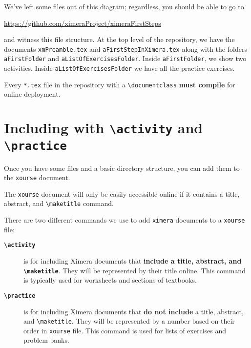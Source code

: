 \documentclass{ximera}
\begin{document}
We've left some files out of this diagram; regardless, you should be able to
go to
\begin{center}
  \url{https://github.com/ximeraProject/ximeraFirstSteps}
\end{center}
and witness this file structure. At the top level of the repository, we have
the documents \verb!xmPreamble.tex! and \verb!aFirstStepInXimera.tex! along
with
the folders \verb!aFirstFolder! and \verb!aListOfExercisesFolder!. Inside
\verb!aFirstFolder!, we show
two activities. Inside
\verb!aListOfExercisesFolder!
we have all the practice exercises.

\begin{warning}
  Every \verb!*.tex! file in the repository with a \verb!\documentclass!
  \textbf{must compile} for online deployment.
\end{warning}

\section{Including with \texttt{\textbackslash activity} and
  \texttt{\textbackslash practice}}

Once you have some files and a basic directory structure, you can add them to
the \verb!xourse! document.

\begin{warning}
  The \verb!xourse! document will only be easily accessible online if it
  contains a title,
  abstract, and {\tt\textbackslash maketitle} command.
\end{warning}

There are two different commands we use to add
\verb!ximera! documents to a \verb!xourse! file:
\begin{description}
  \item[\tt\bfseries\textbackslash activity] is for including Ximera documents
    that
    \textbf{include a title,
      abstract, and \tt\bfseries\textbackslash maketitle}. They will be
    represented by
    their title
    online. This command is typically used for worksheets and sections of
    textbooks.
  \item[\tt\bfseries\textbackslash practice] is for including Ximera documents
    that \textbf{do
      not include} a title, abstract, and \verb!\maketitle!. They will be
    represented by a number  based on their
    order in \verb!xourse! file. This command is used for lists of exercises
    and problem
    banks.
\end{description}
\end{document}
